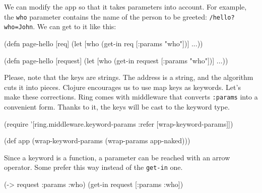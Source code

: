 We can modify the app so that it takes parameters into account. For example, the \verb|who| parameter contains the name of the person to be greeted:
\verb|/hello?who=John|. We can get to it like this:

\ifx\DEVICETYPE\MOBILE

\begin{english}
  \begin{clojure}
(defn page-hello [req]
  (let [who (get-in req [:params "who"])]
    ...))
  \end{clojure}
\end{english}

\else

\begin{english}
  \begin{clojure}
(defn page-hello [request]
  (let [who (get-in request [:params "who"])]
    ...))
  \end{clojure}
\end{english}

\fi


Please, note that the keys are strings. The address is a string, and the algorithm cuts it into pieces. Clojure encourages us to use map keys as keywords. Let's make these corrections. Ring comes with middleware that converts \verb|:params| into a convenient form. Thanks to it, the keys will be cast to the keyword type.


\begin{english}
  \begin{clojure}
(require '[ring.middleware.keyword-params
           :refer [wrap-keyword-params]])

(def app (wrap-keyword-params
           (wrap-params app-naked)))
  \end{clojure}
\end{english}


Since a keyword is a function, a parameter can be reached with an arrow operator. Some prefer this way instead of the \verb|get-in| one.

\begin{english}
  \begin{clojure}
(-> request :params :who)
(get-in request [:params :who])
  \end{clojure}
\end{english}

